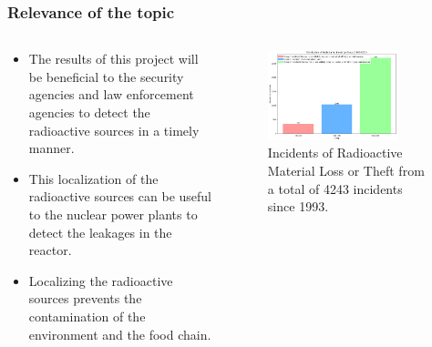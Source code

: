 \documentclass[aspectratio=169]{beamer}
\begin{document}
\begin{frame}
  \frametitle{Relevance of the topic}
  
  \begin{columns}
    \begin{column}{0.5\textwidth}
      \begin{itemize}
        \item The results of this project will be beneficial to the security agencies and law enforcement agencies to detect the radioactive sources in a timely manner.
        \item This localization of the radioactive sources can be useful to the nuclear power plants to detect the leakages in the reactor.
        \item Localizing the radioactive sources prevents the contamination of the environment and the food chain.
      \end{itemize}
  
    \end{column}
    \begin{column}{0.5\textwidth}
      \begin{figure}
        \centering
        \includegraphics[width=0.8\textwidth]{images/radi_incidents.png}
        \caption{Incidents of Radioactive Material Loss or Theft from a total of 4243 incidents since 1993. \cite{iaea2022itdb}}
        \label{fig:Relevance}
      \end{figure}
    \end{column}
  \end{columns}
    
  \end{frame}



\end{document}

